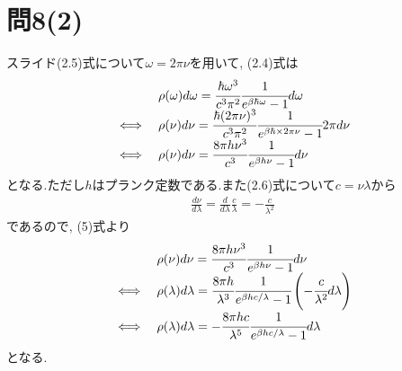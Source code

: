 \documentclass[uplatex,a4j,11pt,dvipdfmx]{jsarticle}
\begin{document}
\section*{問8(2)}
スライド(2.5)式について$\omega=2\pi\nu$を用いて, (2.4)式は
\begin{align}
  \begin{array}{cl}
    &\rho(\omega)d\omega=\cfrac{\hbar\omega^3}{c^3\pi^2}\cfrac{1}{e^{\beta\hbar\omega}-1}d\omega\\
    \iff&\rho(\nu)d\nu=\cfrac{\hbar(2\pi\nu)^3}{c^3\pi^2}\cfrac{1}{e^{\beta\hbar\times2\pi\nu}-1}2\pi d\nu\\
    \iff&\rho(\nu)d\nu=\cfrac{8\pi h\nu^3}{c^3}\cfrac{1}{e^{\beta h\nu}-1}d\nu
  \end{array}
\end{align}
となる.ただし$h$はプランク定数である.また(2.6)式について$c=\nu\lambda$から
\begin{align}
  \frac{d\nu}{d\lambda}=\frac{d}{d\lambda}\frac{c}{\lambda}=-\frac{c}{\lambda^2}
\end{align}
であるので, (5)式より
\begin{align}
  \begin{array}{cl}
    &\rho(\nu)d\nu=\cfrac{8\pi h\nu^3}{c^3}\cfrac{1}{e^{\beta h\nu}-1}d\nu\\
    \iff&\rho(\lambda)d\lambda=\cfrac{8\pi h}{\lambda^3}\cfrac{1}{e^{\beta hc/\lambda}-1}\left(-\cfrac{c}{\lambda^2}d\lambda\right)\\
    \iff&\rho(\lambda)d\lambda=-\cfrac{8\pi hc}{\lambda^5}\cfrac{1}{e^{\beta hc/\lambda}-1}d\lambda\\
  \end{array}
\end{align}
となる.

\end{document}
